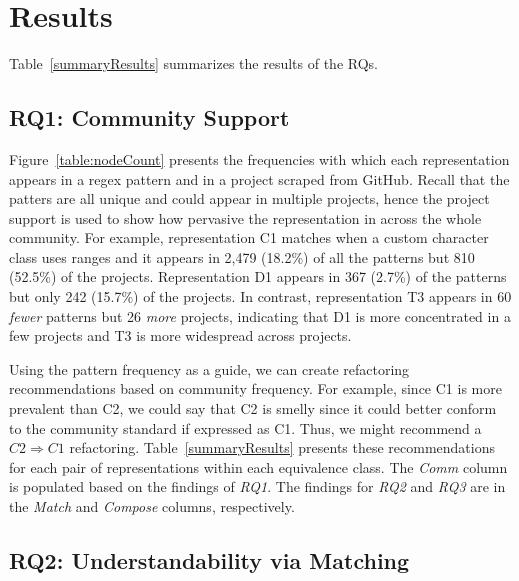 
\section{Results}
\label{sec:results}
Table~\ref{summaryResults} summarizes the results of the RQs.  



\subsection{RQ1: Community Support}
Figure~\ref{table:nodeCount} presents the frequencies with which each representation appears in a regex pattern and in a project scraped from GitHub. Recall that the patters are all unique and could appear in multiple projects, hence the project support is used to show how pervasive the representation in across the whole community. For example, representation C1 matches when a custom character class uses ranges and it appears in 2,479 (18.2\%) of all the patterns but 810 (52.5\%) of the projects. Representation D1 appears in 367 (2.7\%) of the patterns but only 242 (15.7\%) of the projects. In contrast, representation T3 appears in 60 \emph{fewer} patterns but 26 \emph{more} projects, indicating that D1 is more concentrated in a few projects and T3 is more widespread across projects. 

Using the pattern frequency as a guide, we can create refactoring recommendations based on community frequency. For example, since C1 is more prevalent than C2, we could say that C2 is smelly since it could better conform to the community standard if expressed as C1. Thus, we might recommend a $C2 \Rightarrow C1$ refactoring. Table~\ref{summaryResults} presents these recommendations for each pair of representations within each equivalence class. The \emph{Comm} column is populated based on the findings of \emph{RQ1}. The findings for \emph{RQ2} and \emph{RQ3} are in the \emph{Match} and \emph{Compose} columns, respectively. 


\subsection{RQ2: Understandability via Matching}

